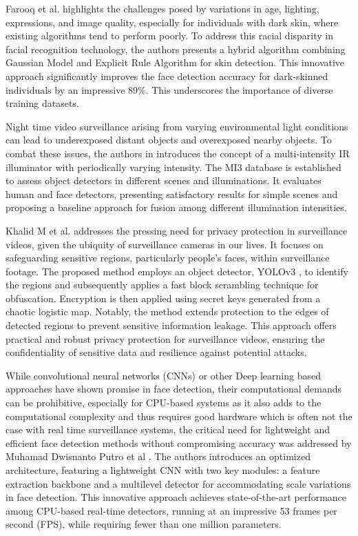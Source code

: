 Farooq et al. \cite{farooq_hybrid_2021} highlights the challenges posed by variations in age, lighting, expressions, and image quality, especially for individuals with dark skin, where existing algorithms tend to perform poorly. To address this racial disparity in facial recognition technology, the authors presents a hybrid algorithm combining Gaussian Model and Explicit Rule Algorithm for skin detection. This innovative approach significantly improves the face detection accuracy for dark-skinned individuals by an impressive 89\%. This underscores the importance of diverse training datasets.

Night time video surveillance arising from varying environmental light conditions can lead to underexposed distant objects and overexposed nearby objects. To combat these issues, the authors in \cite{lu_fusion_2022} introduces the concept of a multi-intensity IR illuminator with periodically varying intensity. The MI3 database is established to assess object detectors in different scenes and illuminations. It evaluates human and face detectors, presenting satisfactory results for simple scenes and proposing a baseline approach for fusion among different illumination intensities.

Khalid M et al. \cite{hosny_privacy_2022} addresses the pressing need for privacy protection in surveillance videos, given the ubiquity of surveillance cameras in our lives. It focuses on safeguarding sensitive regions, particularly people's faces, within surveillance footage. The proposed method employs an object detector, YOLOv3 \cite{aziz_exploring_2020}, to identify the regions and subsequently applies a fast block scrambling technique for obfuscation. Encryption is then applied using secret keys generated from a chaotic logistic map. Notably, the method extends protection to the edges of detected regions to prevent sensitive information leakage. This approach offers practical and robust privacy protection for surveillance videos, ensuring the confidentiality of sensitive data and resilience against potential attacks.

While convolutional neural networks (CNNs) or other Deep learning based approaches have shown promise in face detection, their computational demands can be prohibitive, especially for CPU-based systems as it also adds to the computational complexity and thus requires good hardware which is often not the case with real time surveillance systems, the critical need for lightweight and efficient face detection methods without compromising accuracy was addressed by Muhamad Dwisnanto Putro et al \cite{putro_high_2021}. The authors introduces an optimized architecture, featuring a lightweight CNN with two key modules: a feature extraction backbone and a multilevel detector for accommodating scale variations in face detection. This innovative approach achieves state-of-the-art performance among CPU-based real-time detectors, running at an impressive 53 frames per second (FPS), while requiring fewer than one million parameters.